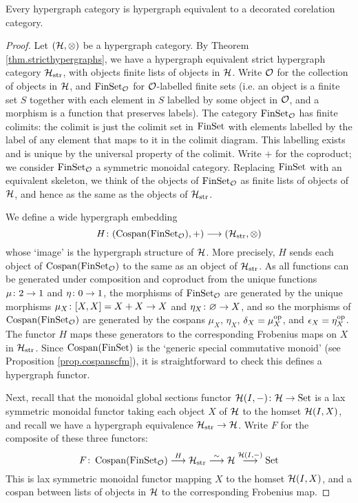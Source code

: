 \begin{theorem}\label{thm.hypdeccorcats}
  Every hypergraph category is hypergraph equivalent to a decorated corelation
  category.
\end{theorem}
\begin{proof}
  Let $(\mathcal H,\otimes)$ be a hypergraph category. By Theorem
  \ref{thm.stricthypergraphs}, we have a hypergraph equivalent strict hypergraph
  category $\mathcal H_{\mathrm{str}}$, with objects finite lists of objects in $\mathcal
  H$. Write $\mathcal O$ for the collection of objects in $\mathcal H$, and $\mathrm{FinSet}_{\mathcal
  O}$ for $\mathcal O$-labelled finite sets (i.e. an object is a finite set $S$
  together with each element in $S$ labelled by some object in $\mathcal O$, and a
  morphism is a function that preserves labels). The category $\mathrm{FinSet}_{\mathcal O}$
  has finite colimits: the colimit is just the colimit set in $\mathrm{FinSet}$ with
  elements labelled by the label of any element that maps to it in the colimit
  diagram. This labelling exists and is unique by the universal property of the
  colimit. Write $+$ for the coproduct; we consider $\mathrm{FinSet}_{\mathcal O}$ a
  symmetric monoidal category.  Replacing $\mathrm{FinSet}$ with an equivalent skeleton,
  we think of the objects of $\mathrm{FinSet}_{\mathcal O}$ as finite lists of objects of
  $\mathcal H$, and hence as the same as the objects of $\mathcal H_{\mathrm{str}}$.

  We define a wide hypergraph embedding
  \[
    H{\colon} (\operatorname{{Cospan}}(\mathrm{FinSet}_{\mathcal O}),+) \longrightarrow (\mathcal
    H_{\mathrm{str}},\otimes)
  \]
  whose `image' is the hypergraph structure of $\mathcal H$. More precisely, $H$
  sends each object of $\operatorname{{Cospan}}(\mathrm{FinSet}_{\mathcal O})$ to the same as an object of
  $\mathcal H_{\mathrm{str}}$. As all functions can be generated under composition
  and coproduct from the unique functions $\mu {\colon} 2 \to 1$ and $\eta {\colon} 0
  \to 1$, the morphisms of $\mathrm{FinSet}_{\mathcal O}$ are generated by the unique
  morphisms $\mu_X{\colon} [X,X]=X+X \to X$ and $\eta_X{\colon} \varnothing \to X$,
  and so the morphisms of $\operatorname{{Cospan}}(\mathrm{FinSet}_{\mathcal O})$ are generated by the
  cospans $\mu_X$, $\eta_X$, $\delta_X = \mu_X^{\mathrm{op}}$, and $\epsilon_X =
  \eta_X^{\mathrm{op}}$. The functor $H$ maps these generators to the corresponding
  Frobenius maps on $X$ in $\mathcal H_{\mathrm{str}}$. Since $\operatorname{{Cospan}}(\mathrm{FinSet})$ is
  the `generic special commutative monoid' (see Proposition
  \ref{prop.cospanscfm}), it is straightforward to check this defines a
  hypergraph functor.

  Next, recall that the monoidal global sections functor $\mathcal H(I,-){\colon} \mathcal H
  \to \mathrm{Set}$ is a lax symmetric monoidal functor taking each object $X$ of $\mathcal
  H$ to the homset $\mathcal H(I,X)$, and recall we have a hypergraph equivalence
  $\mathcal H_{\mathrm{str}} \to \mathcal H$. Write $F$ for the composite of these three
  functors: 
  \[
    F{\colon} \operatorname{{Cospan}}(\mathrm{FinSet}_{\mathcal O}) \stackrel{H}\longrightarrow \mathcal
    H_{\mathrm{str}} \stackrel{\sim}\longrightarrow \mathcal H \stackrel{\mathcal
    H(I,-)}\longrightarrow \mathrm{Set}
  \]
  This is lax symmetric monoidal functor mapping $X$ to the homset $\mathcal H(I,X)$,
  and a cospan between lists of objects in $\mathcal H$ to the corresponding
  Frobenius map.


\end{proof}
